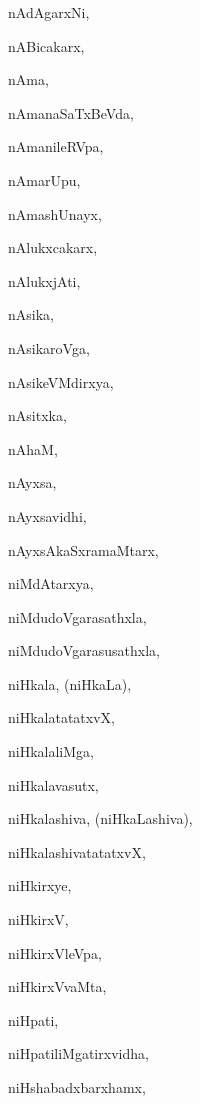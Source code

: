 \begin{multicols}{2}
{nAdAgarxNi}, \pageref{nAdAgarxNi}

{nABicakarx}, \pageref{nABicakarx}

{nAma}, \pageref{nAma}

{nAmanaSaTxBeVda}, \pageref{nAmanaSaTxBeVda}

{nAmanileRVpa}, \pageref{nAmanileRVpa}

{nAmarUpu}, \pageref{nAmarUpu}

{nAmashUnayx}, \pageref{nAmashUnayx}

{nAlukxcakarx}, \pageref{nAlukxcakarx}

{nAlukxjAti}, \pageref{nAlukxjAti}

{nAsika}, \pageref{nAsika}

{nAsikaroVga}, \pageref{nAsikaroVga}

{nAsikeVMdirxya}, \pageref{nAsikeVMdirxya}

{nAsitxka}, \pageref{nAsitxka}

{nAhaM}, \pageref{nAhaM}

{nAyxsa}, \pageref{nAyxsa}

{nAyxsavidhi}, \pageref{nAyxsavidhi}

{nAyxsAkaSxramaMtarx}, \pageref{nAyxsAkaSxramaMtarx}

{niMdAtarxya}, \pageref{niMdAtarxya}

{niMdudoVgarasathxla}, \pageref{niMdudoVgarasathxla}

{niMdudoVgarasusathxla}, \pageref{niMdudoVgarasusathxla}

{niHkala, (niHkaLa)}, \pageref{niHkala,niHkaLa}

{niHkalatatatxvX}, \pageref{niHkalatatatxvX}

{niHkalaliMga}, \pageref{niHkalaliMga}

{niHkalavasutx}, \pageref{niHkalavasutx}

{niHkalashiva, (niHkaLashiva)}, \pageref{niHkalashiva,niHkaLashiva}

{niHkalashivatatatxvX}, \pageref{niHkalashivatatatxvX}

{niHkirxye}, \pageref{niHkirxye}

{niHkirxV}, \pageref{niHkirxV}

{niHkirxVleVpa}, \pageref{niHkirxVleVpa}

{niHkirxVvaMta}, \pageref{niHkirxVvaMta}

{niHpati}, \pageref{niHpati}

{niHpatiliMgatirxvidha}, \pageref{niHpatiliMgatirxvidha}

{niHshabadxbarxhamx}, \pageref{niHshabadxbarxhamx}


\end{multicols}
